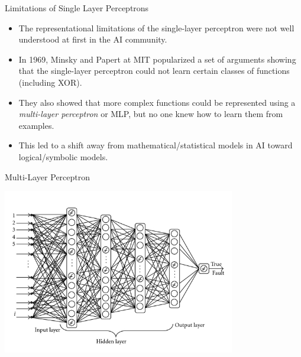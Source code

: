 \documentclass[serif,xcolor=pdftex,dvipsnames,table,hyperref={bookmarks=false}]{beamer}
\begin{document}
\begin{frame}[t]{Limitations of Single Layer Perceptrons}

\begin{itemize}
\setlength{\itemsep}{8pt}

\item The representational limitations of the single-layer perceptron were not well understood at first in the AI community.

\pause\item In 1969, Minsky and Papert at MIT popularized a set of arguments showing that the single-layer perceptron could not learn certain classes of functions (including XOR). 

\pause\item They also showed that more complex functions could be represented using a
\textit{multi-layer perceptron} or MLP, but no one knew how to learn them from examples.

\pause\item This led to a shift away from mathematical/statistical models in AI toward
logical/symbolic models.

\end{itemize}

\end{frame}


\begin{frame}[t]{Multi-Layer Perceptron}

\center
\includegraphics[width=4in]{../Figures/sigmoid_network.jpg}

\end{frame}
\end{document}
